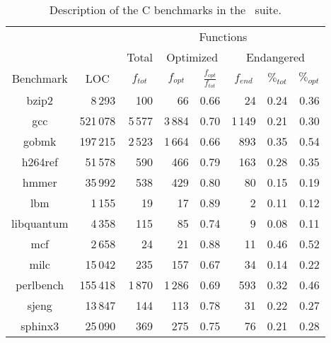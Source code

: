 \begin{table}[ht]
\begin{center}
\begin{small}
\begin{tabular}{ |c|r|r|r|r|r|r|r| }
\cline{3-8}
\multicolumn{2}{l|}{} & \multicolumn{6}{c|}{Functions} \\
\cline{3-8}
\multicolumn{2}{l|}{} & \multicolumn{1}{c|}{Total} & \multicolumn{2}{c|}{Optimized} & \multicolumn{3}{c|}{Endangered} \\
\hline
Benchmark & \multicolumn{1}{c|}{LOC} & \multicolumn{1}{c|}{$f_{tot}$} & \multicolumn{1}{c|}{$f_{opt}$}  & \multicolumn{1}{c|}{$\frac{f_{opt}}{f_{tot}}$} & \multicolumn{1}{c|}{$f_{end}$} & \multicolumn{1}{c|}{$\%_{tot}$} & \multicolumn{1}{c|}{$\%_{opt}$} \\ 
\hline
\hline
bzip2 & 8\,293 & 100 & 66 & 0.66 & 24 & 0.24 & 0.36 \\ 
\hline
gcc & 521\,078 & 5\,577 & 3\,884 & 0.70 & 1\,149 & 0.21 & 0.30 \\
\hline
gobmk & 197\,215 & 2\,523 & 1\,664 & 0.66 & 893 & 0.35 & 0.54 \\ 
\hline
h264ref & 51\,578 & 590 & 466 & 0.79 & 163 & 0.28 & 0.35 \\ 
\hline
hmmer & 35\,992 & 538 & 429 & 0.80 & 80 & 0.15 & 0.19 \\ 
\hline
lbm & 1\,155 & 19 & 17 & 0.89 & 2 & 0.11 & 0.12 \\ 
\hline
libquantum & 4\,358 & 115 & 85 & 0.74 & 9 & 0.08 & 0.11\\ 
\hline
mcf & 2\,658 & 24 & 21 & 0.88 & 11 & 0.46 & 0.52 \\ 
\hline
milc & 15\,042 & 235 & 157 & 0.67 & 34 & 0.14 & 0.22\\ 
\hline
perlbench & 155\,418 & 1\,870 & 1\,286 & 0.69 & 593 & 0.32 & 0.46 \\ 
\hline
sjeng & 13\,847 & 144 & 113 & 0.78 & 31 & 0.22 & 0.27 \\ 
\hline
sphinx3 & 25\,090 & 369 & 275 & 0.75 & 76 & 0.21 & 0.28 \\ 
\hline
\end{tabular} 
\end{small}
\end{center}
\caption{\label{tab:CS-debug-benchmarks} Description of the C benchmarks in the \speccpu\ suite.} 
\end{table}


